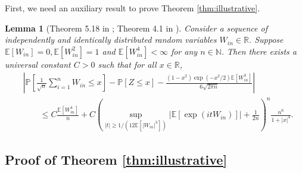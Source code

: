 \documentclass[12pt]{article}
\newtheorem{lemma}{Lemma}
\theoremstyle{definition}
\def\P{\mathbb{P}}
\def\P{\mathbb{P}}
\newcommand{\E}{\mathbb E}								%
\renewcommand{\P}{\mathbb{P}}							%
\begin{document}
First, we need an auxiliary result to prove Theorem \ref{thm:illustrative}. 
\begin{lemma}[Theorem 5.18 in \citep{Petrov1995}; Theorem 4.1 in \citep{kuchibhotla2023central}]\label{lem:asymptotic-expansion}
    Consider a sequence of independently and identically distributed random variables $W_{in}\in\mathbb{R}$. Suppose  $\E[W_{in}]=0,\E[W_{in}^2]=1$ and $\E[W_{in}^4]<\infty$ for any $n\in\mathbb{N}$. Then there exists a universal constant $C>0$ such that for all $x\in\mathbb{R}$,
	\begin{align}
		&\nonumber
		\left|\P\left[\frac{1}{\sqrt{n}}\sum_{i=1}^n W_{in}\leq x\right]-\P[Z\leq x]-\frac{(1-x^2)\exp(-x^2/2)\E[W_{in}^3]}{6\sqrt{2\pi n}}\right|\\
		&\label{eq:asymptotic-expansion-UB}
		\qquad\leq C\frac{\E[W_{in}^4]}{n}+C\left(\sup_{|t|\geq 1/ (12\E[|W_{in}|^3])}|\E[\exp(itW_{in})]|+\frac{1}{2n}\right)^n\frac{n^6}{1+|x|^4}.
	\end{align}
\end{lemma}

\subsection{Proof of Theorem \ref{thm:illustrative}}
\end{document}
